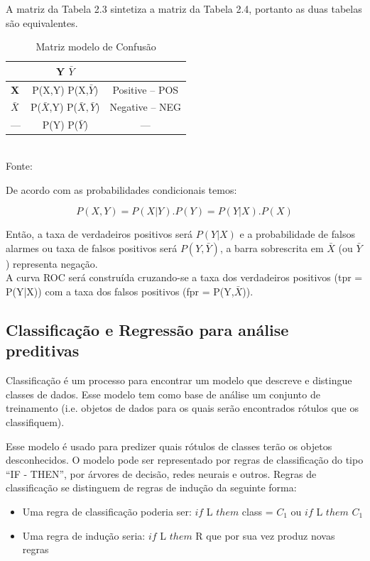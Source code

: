 A matriz da Tabela 2.3 sintetiza a matriz da Tabela 2.4, portanto as duas tabelas são equivalentes.

\begin{table}[ht]
\centering
\caption{Matriz modelo de Confusão}
\vspace{1mm}
\begin{tabular}{l|c|c}
\hline
\textbf{}           & \textbf{Y}     \textbf{$\bar{Y}$}   & \textbf{}\\
\hline
\textbf{X}          & P(X,Y)         P(X,$\bar{Y}$)       & Positive -- POS\\
\textbf{$\bar{X}$}  & P($\bar{X}$,Y) P($\bar{X},\bar{Y}$) & Negative -- NEG\\
\hline
   ---              & P(Y)           P($\bar{Y}$)         &     ---        \\
\end{tabular}
\\
\tiny Fonte: \cite{Bradley1997}
\end{table}


De acordo com as probabilidades condicionais temos:

\begin{equation}
 P(X,Y) = P(X|Y).P(Y) = P(Y|X).P(X)
\end{equation}

Então, a taxa de verdadeiros positivos será $P(Y|X)$ e a probabilidade de falsos alarmes ou taxa de falsos positivos será $P(Y,\bar{Y})$, a barra sobrescrita em $\bar{X}$
(ou $\bar{Y}$) representa negação. \\
A curva ROC será construída cruzando-se a taxa dos verdadeiros positivos (tpr = P(Y|X)) com a taxa dos falsos positivos (fpr = P(Y,$\bar{X}$)).

\pagebreak

\subsection{Classificação e Regressão para análise preditivas}

Classificação é um processo para encontrar um modelo que descreve e distingue classes de dados. 
Esse modelo tem como base de análise um conjunto de treinamento (i.e. objetos de dados para os quais 
serão encontrados rótulos que os classifiquem). 

Esse modelo é usado para predizer quais rótulos de classes terão os objetos desconhecidos.
O modelo pode ser representado por regras de classificação do tipo ``IF - THEN'', por árvores de decisão, redes neurais e outros. 
Regras de classificação se distinguem de regras de indução da seguinte forma:
\begin{itemize}
	\item Uma regra de classificação poderia ser: $if$ L $them$ class = $C_{1}$ ou $if$ L $them$  $C_{1}$
	\item Uma regra de indução seria: $ if$ L $them$ R que por sua vez produz novas regras 
\end{itemize}

